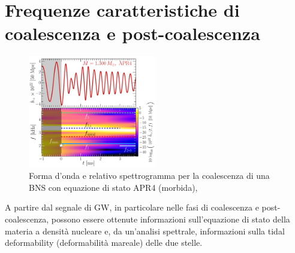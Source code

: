 
\section[Frequenze caratteristiche]{Frequenze caratteristiche di coalescenza e post-coalescenza}
\label{section:frequenze_caratteristiche}
\begin{figure}
	\vspace{-15pt}
	\begin{center}
		\includegraphics[width=0.5\textwidth]{figures/Capitolo_1/GW_spectrogram_short_APR4-q10-M1300.pdf}
	\end{center}
	\vspace{-10pt}
	\caption{Forma d'onda e relativo spettrogramma per la coalescenza di una BNS con equazione di stato APR4 (morbida), \cite{Rezzolla_2016}}
	\label{fig:spettrogramma_merger_APR4}
	\vspace{-20pt}
\end{figure}
A partire dal segnale di GW, in particolare nelle fasi di coalescenza e post-coalescenza, possono essere ottenute informazioni sull'equazione di stato della materia a densità nucleare e, da un'analisi spettrale, informazioni sulla tidal deformability (deformabilità mareale) delle due stelle.

